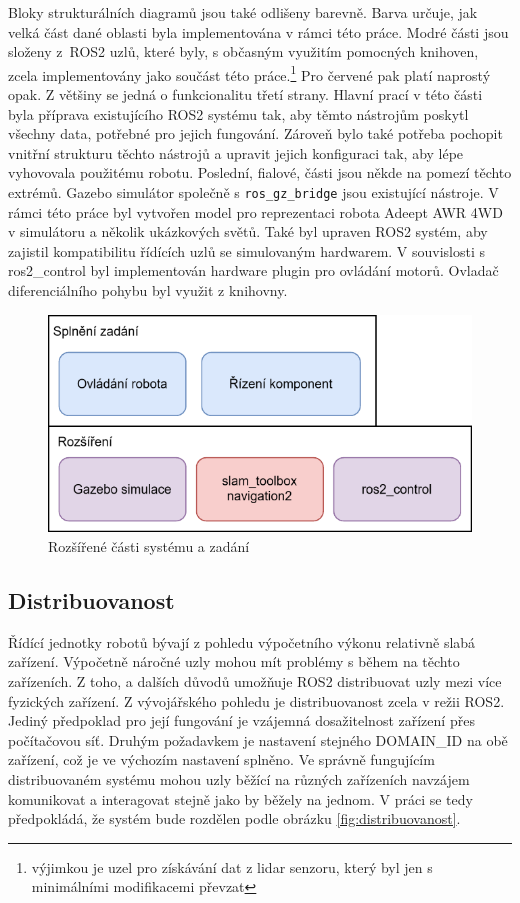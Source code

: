 Bloky strukturálních diagramů jsou také odlišeny barevně. Barva určuje, jak velká část dané oblasti byla implementována v rámci této práce. \textcolor[RGB]{108,142,191}{Modré} části jsou složeny z~ROS2 uzlů, které byly, s občasným využitím pomocných knihoven, zcela implementovány jako součást této práce.\footnote{výjimkou je uzel pro získávání dat z lidar senzoru, který byl jen s minimálními modifikacemi převzat} Pro \textcolor[RGB]{184,84,80}{červené} pak platí naprostý opak. Z většiny se jedná o funkcionalitu třetí strany. Hlavní prací v této části byla příprava existujícího ROS2 systému tak, aby těmto nástrojům poskytl všechny data, potřebné pro jejich fungování. Zároveň bylo také potřeba pochopit vnitřní strukturu těchto nástrojů a upravit jejich konfiguraci tak, aby lépe vyhovovala použitému robotu. Poslední, \textcolor[RGB]{150,115,166}{fialové}, části jsou někde na pomezí těchto extrémů. Gazebo simulátor společně s \verb|ros_gz_bridge| jsou existující nástroje. V rámci této práce byl vytvořen model pro reprezentaci robota Adeept AWR 4WD v simulátoru a několik ukázkových světů. Také byl upraven ROS2 systém, aby zajistil kompatibilitu řídících uzlů se simulovaným hardwarem. V souvislosti s ros2\_control byl implementován hardware plugin pro ovládání motorů. Ovladač diferenciálního pohybu byl využit z knihovny.

\begin{figure}[h!]
	\centering
	\includegraphics[scale=0.75]{obrazky-figures/zadání.pdf}
	\caption{Rozšířené části systému a zadání}
	\label{fig:zadani}
\end{figure}

\subsection*{Distribuovanost}
Řídící jednotky robotů bývají z pohledu výpočetního výkonu relativně slabá zařízení. Výpočetně náročné uzly mohou mít problémy s během na těchto zařízeních. Z toho, a dalších důvodů umožňuje ROS2 distribuovat uzly mezi více fyzických zařízení. Z vývojářského pohledu je distribuovanost zcela v režii ROS2. Jediný předpoklad pro její fungování je vzájemná dosažitelnost zařízení přes počítačovou síť. Druhým požadavkem je nastavení stejného DOMAIN\_ID na obě zařízení, což je ve výchozím nastavení splněno. Ve správně fungujícím distribuovaném systému mohou uzly běžící na různých zařízeních navzájem komunikovat a interagovat stejně jako by běžely na jednom. V práci se tedy předpokládá, že systém bude rozdělen podle obrázku \ref{fig:distribuovanost}.

